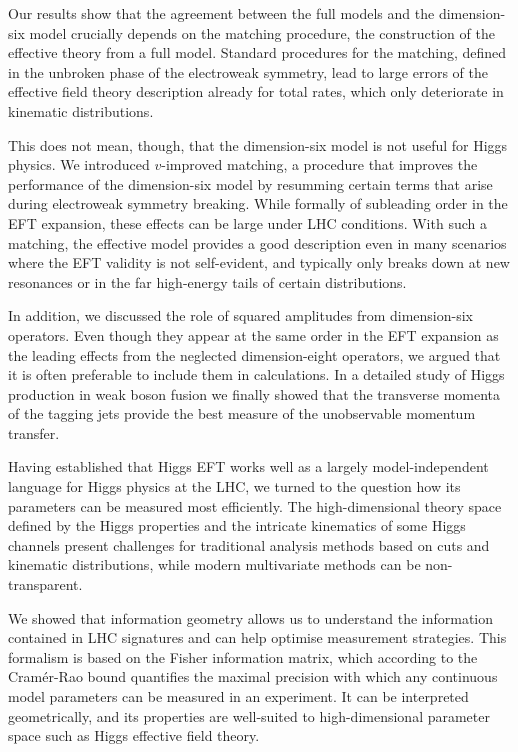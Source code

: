 Our results show that the agreement between the full models and the
dimension-six model crucially depends on the matching procedure, \ie
the construction of the effective theory from a full model. Standard
procedures for the matching, defined in the unbroken phase of the
electroweak symmetry, lead to large errors of the effective field
theory description already for total rates, which only deteriorate
in kinematic distributions.

This does not mean, though, that the dimension-six model is not useful
for Higgs physics. We introduced $v$-improved matching, a procedure
that improves the performance of the dimension-six model by resumming
certain terms that arise during electroweak symmetry breaking. While
formally of subleading order in the EFT expansion, these effects can
be large under LHC conditions. With such a matching, the effective
model provides a good description even in many scenarios where the EFT
validity is not self-evident, and typically only breaks down at new
resonances or in the far high-energy tails of certain distributions.

In addition, we discussed the role of squared amplitudes from dimension-six
operators. Even though they appear at the same order in the EFT
expansion as the leading effects from the neglected dimension-eight
operators, we argued that it is often preferable to include them
in calculations. In a detailed study of Higgs production in weak boson
fusion we finally showed that the transverse momenta of the tagging
jets provide the best measure of the unobservable momentum transfer.

\newparagraph
%
Having established that Higgs EFT works well as a largely
model-independent language for Higgs physics at the LHC, we turned to
the question how its parameters can be measured most efficiently. The
high-dimensional theory space defined by the Higgs properties and the
intricate kinematics of some Higgs channels present challenges for
traditional analysis methods based on cuts and kinematic
distributions, while modern multivariate methods can be non-transparent.

We showed that information geometry allows us to understand the
information contained in LHC signatures and can help optimise
measurement strategies. This formalism is based on the Fisher
information matrix, which according to the Cram\'er-Rao bound
quantifies the maximal precision with which any continuous model
parameters can be measured in an experiment. It can be interpreted
geometrically, and its properties are well-suited to high-dimensional
parameter space such as Higgs effective field theory.

